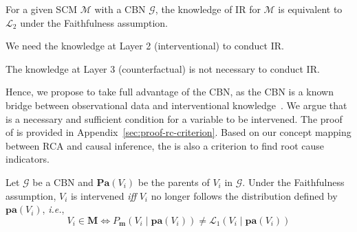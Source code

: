 \begin{theorem}\label{thm:rca-l2}
	For a given SCM $\mathcal{M}$ with a CBN $\mathcal{G}$, the knowledge of IR for $\mathcal{M}$ is equivalent to $\mathcal{L}_{2}$ under the Faithfulness assumption.
\end{theorem}

\begin{corollary}\label{thm:l2-necessary}
	We need the knowledge at Layer 2 (interventional) to conduct IR.
\end{corollary}

\begin{corollary}\label{thm:l3-unnecessary}
	The knowledge at Layer 3 (counterfactual) is not necessary to conduct IR.
\end{corollary}

Hence, we propose to take full advantage of the CBN, as the CBN is a known bridge between observational data and interventional knowledge~\cite{Bareinboim:2022}.
We argue that  is a necessary and sufficient condition for a variable to be intervened.
The proof of  is provided in Appendix~\ref{sec:proof-rc-criterion}.
Based on our concept mapping between RCA and causal inference, the  is also a criterion to find root cause indicators.

\begin{theorem}\label{thm:rc-criterion}
	Let $\mathcal{G}$ be a CBN and $\mathbf{Pa}(V_{i})$ be the parents of $V_{i}$ in $\mathcal{G}$.
	Under the Faithfulness assumption, $V_{i}$ is intervened \textit{iff} $V_{i}$ no longer follows the distribution defined by $\mathbf{pa}(V_{i})$, \textit{i.e.},
	\begin{equation*}
		V_{i} \in \mathbf{M} \Leftrightarrow P_{\mathbf{m}}(V_{i} \mid \mathbf{pa}(V_{i})) \neq \mathcal{L}_{1}(V_{i} \mid \mathbf{pa}(V_{i}))
	\end{equation*}
\end{theorem}


